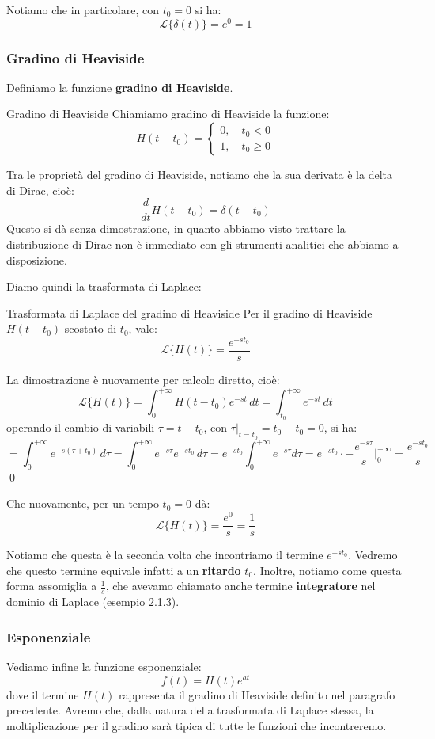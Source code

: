 \documentclass[a4paper,11pt]{article}
\begin{document}
Notiamo che in particolare, con $t_0 = 0$ si ha:
$$
\mathcal{L}\{\delta(t)\} = e^0 = 1
$$

\subsubsection{Gradino di Heaviside}
Definiamo la funzione \textbf{gradino di Heaviside}.
\begin{definition}{Gradino di Heaviside}
	Chiamiamo gradino di Heaviside la funzione:
	$$
	H(t - t_0) = 
	\begin{cases}
		0, \quad t_0 < 0 \\
		1, \quad t_0 \geq 0
	\end{cases}
	$$
\end{definition}

Tra le proprietà del gradino di Heaviside, notiamo che la sua derivata è la delta di Dirac, cioè:
$$
\frac{d}{dt}H(t - t_0) = \delta(t - t_0)
$$
Questo si dà senza dimostrazione, in quanto abbiamo visto trattare la distribuzione di Dirac non è immediato con gli strumenti analitici che abbiamo a disposizione.

Diamo quindi la trasformata di Laplace:
\begin{theorem}{Trasformata di Laplace del gradino di Heaviside}
	Per il gradino di Heaviside $H(t - t_0)$ scostato di $t_0$, vale:
	$$
	\mathcal{L}\{H(t)\} = \frac{e^{-s t_0}}{s}
	$$
\end{theorem}
La dimostrazione è nuovamente per calcolo diretto, cioè:
$$
\mathcal{L}\{H(t)\} = \int_{0}^{+\infty} H(t - t_0) e^{-st} \, dt =\int_{t_0}^{+\infty} e^{-st} \, dt 
$$
operando il cambio di variabili $\tau = t - t_0$, con $\tau |_{t = t_0} = t_0 - t_0 = 0$, si ha:
$$
= \int_0^{+\infty} e^{-s(\tau + t_0)} \, d\tau = \int_0^{+\infty} e^{-s\tau} e^{-s t_0} \, d\tau = e^{-s t_0} \int_0^{+\infty} e^{-s \tau} d\tau = e^{-s t_0} \cdot -\frac{e^{-s \tau}}{s} \Bigg|^{+\infty}_0 = \frac{e^{-s t_0}}{s}
$$
\qed

Che nuovamente, per un tempo $t_0=0$ dà:
$$
\mathcal{L}\{H(t)\} = \frac{e^0}{s} = \frac{1}{s}
$$

Notiamo che questa è la seconda volta che incontriamo il termine $e^{-s t_0}$. Vedremo che questo termine equivale infatti a un \textbf{ritardo} $t_0$.
Inoltre, notiamo come questa forma assomiglia a $\frac{1}{s}$, che avevamo chiamato anche termine \textbf{integratore} nel dominio di Laplace (esempio 2.1.3).

\subsubsection{Esponenziale}
Vediamo infine la funzione esponenziale:
		$$
		f(t) = H(t) e^{at}
		$$
		dove il termine $H(t)$ rappresenta il gradino di Heaviside definito nel paragrafo precedente.
		Avremo che, dalla natura della trasformata di Laplace stessa, la moltiplicazione per il gradino sarà tipica di tutte le funzioni che incontreremo.
\end{document}
